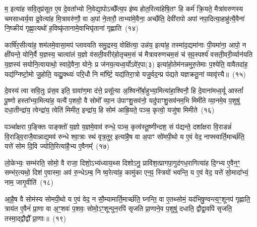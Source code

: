 म॒ इत्या॑ह सवि॒तृप्र॑सूत ए॒व दे॒वता᳚भ्यो नि॒वेद्या॒पो\-ऽच्छै᳚त्य॒प इ॑ष्य होत॒रित्या॑हेषि॒तꣳ हि कर्म॑ क्रि॒यते॒ मैत्रा॑वरुणस्य चमसाध्वर्य॒वा द्र॒वेत्या॑ह मि॒त्रावरु॑णौ॒ वा अ॒पां ने॒तारौ॒ ताभ्या॑मे॒वैना॒ अच्छै॑ति॒ देवी॑रापो अपां नपा॒दित्या॒हाहु॑त्यै॒वैना॑ नि॒ष्क्रीय॑ गृह्णा॒त्यथो॑ ह॒विष्कृ॑तानामे॒वाभिघृ॑तानां गृह्णाति~(१४)\ip

कार्\mbox{}षि॑र॒सीत्या॑ह॒ शम॑लमे॒वासा॒मप॑ प्लावयति समु॒द्रस्य॒ वोक्षि॑त्या॒ उन्न॑य॒ इत्या॑ह॒ तस्मा॑द॒द्यमा॑नाः पी॒यमा॑ना॒ आपो॒ न क्षी॑यन्ते॒ योनि॒र्वै य॒ज्ञस्य॒ चात्वा॑लं य॒ज्ञो व॑सती॒वरीर्॑\mbox{}होतृचम॒सं च॑ मैत्रावरुणचम॒सं च॑ स॒ꣴ॒स्पर्श्य॑ वसती॒वरी॒र्व्यान॑यति य॒ज्ञस्य॑ सयोनि॒त्वायाथो॒ स्वादे॒वैना॒ योनेः॒ प्र ज॑नय॒त्यध्व॒र्यो\-ऽवे॑र॒पा(३) इत्या॑हो॒तेम॑नन्नमुरु॒तेमाः प॒श्येति॒ वावैतदा॑ह॒ यद्य॑ग्निष्टो॒मो जु॒होति॒ यद्यु॒क्थ्यः॑ परि॒धौ नि मा᳚र्ष्टि॒ यद्य॑तिरा॒त्रो यजु॒र्वद॒न्प्र प॑द्यते यज्ञक्रतू॒नां व्यावृ॑त्त्यै॥~(१५)\ip

{\anuvakamend[{वा॒चो हव॑म॒भिघृ॑तानां गृह्णात्यु॒त पञ्च॑विꣳशतिश्च}]}

दे॒वस्य॑ त्वा सवि॒तुः प्र॑स॒व इति॒ ग्रावा॑ण॒मा द॑त्ते॒ प्रसू᳚त्या अ॒श्विनो᳚र्बा॒हुभ्या॒मित्या॑हा॒श्विनौ॒ हि दे॒वाना॑मध्व॒र्यू आस्तां᳚ पू॒ष्णो हस्ता᳚भ्या॒मित्या॑ह॒ यत्यै॑ प॒शवो॒ वै सोमो᳚ व्या॒न उ॑पाꣳशु॒सव॑नो॒ यदु॑पाꣳशु॒सव॑नम॒भि मिमी॑ते व्या॒नमे॒व प॒शुषु॑ दधा॒तीन्द्रा॑य॒ त्वेन्द्रा॑य॒ त्वेति॑ मिमीत॒ इन्द्रा॑य॒ हि सोम॑ आह्रि॒यते॒ पञ्च॒ कृत्वो॒ यजु॑षा मिमीते~(१६)\ip

पञ्चा᳚क्षरा प॒ङ्क्तिः पाङ्क्तो॑ य॒ज्ञो य॒ज्ञमे॒वाव॑ रुन्धे॒ पञ्च॒ कृत्व॑स्तू॒ष्णीन्दश॒ सं प॑द्यन्ते॒ दशा᳚क्षरा वि॒राडन्नं॑ वि॒राड्वि॒राजै॒वान्नाद्य॒मव॑ रुन्धे श्वा॒त्राः स्थ॑ वृत्र॒तुर॒ इत्या॑है॒ष वा अ॒पाꣳ सो॑मपी॒थो य ए॒वं वेद॒ नाफ्स्वार्ति॒मार्च्छ॑ति॒ यत्ते॑ सोम दि॒वि ज्योति॒रित्या॑है॒भ्य ए॒वैनम्᳚~(१७)\ip

लो॒केभ्यः॒ सम्भ॑रति॒ सोमो॒ वै राजा॒ दिशो॒\-ऽभ्य॑ध्याय॒थ्स दिशो\-ऽनु॒ प्रावि॑श॒त्प्रागपा॒गुद॑गध॒रागित्या॑ह दि॒ग्भ्य ए॒वैन॒ꣳ॒ सम्भ॑र॒त्यथो॒ दिश॑ ए॒वास्मा॒ अव॑ रु॒न्धे\-ऽम्ब॒ नि ष्व॒रेत्या॑ह॒ कामु॑का एन॒ꣴ॒ स्त्रियो॑ भवन्ति॒ य ए॒वं वेद॒ यत्ते॑ सो॒मादा᳚भ्यं॒ नाम॒ जागृ॒वीति॑~(१८)\ip

आ॒है॒ष वै सोम॑स्य सोमपी॒थो य ए॒वं वेद॒ न सौ॒म्यामार्ति॒मार्च्छ॑ति॒ घ्नन्ति॒ वा ए॒तथ्सोमं॒ यद॑भिषु॒ण्वन्त्य॒ꣳ॒शूनप॑ गृह्णाति॒ त्राय॑त ए॒वैनं॑ प्रा॒णा वा अ॒ꣳ॒शवः॑ प॒शवः॒ सोमो॒\-ऽꣳ॒शून्पुन॒रपि॑ सृजति प्रा॒णाने॒व प॒शुषु॑ दधाति॒ द्वौद्वा॒वपि॑ सृजति॒ तस्मा॒द्द्वौद्वौ᳚ प्रा॒णाः॥~(१९)\ip

{\anuvakamend[{यजु॑षा मिमीत एनं॒ जागृ॒वीति॒ चतु॑श्चत्वारिꣳशच्च}]}

